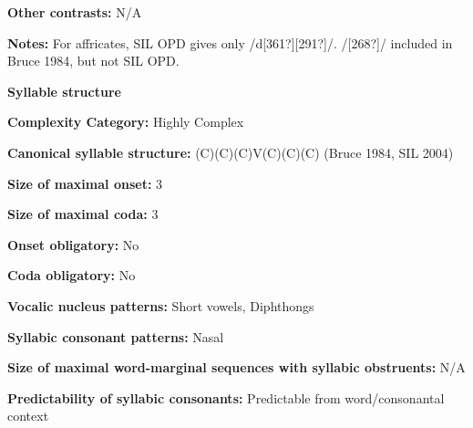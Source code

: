 \begin{styleBody}
\textbf{Other contrasts:} N/A
\end{styleBody}

\begin{styleBody}
\textbf{Notes:} For affricates, SIL OPD gives only /d[361?][291?]/. /[268?]/ included in Bruce 1984, but not SIL OPD.
\end{styleBody}

\begin{styleBody}
\textbf{Syllable structure}
\end{styleBody}

\begin{styleBody}
\textbf{Complexity Category:} Highly Complex
\end{styleBody}

\begin{styleBody}
\textbf{Canonical syllable structure:} (C)(C)(C)V(C)(C)(C)\textbf{ }(Bruce 1984, SIL 2004)
\end{styleBody}

\begin{styleBody}
\textbf{Size of maximal onset:} 3
\end{styleBody}

\begin{styleBody}
\textbf{Size of maximal coda:} 3
\end{styleBody}

\begin{styleBody}
\textbf{Onset obligatory:} No
\end{styleBody}

\begin{styleBody}
\textbf{Coda obligatory:} No
\end{styleBody}

\begin{styleBody}
\textbf{Vocalic nucleus patterns:} Short vowels, Diphthongs
\end{styleBody}

\begin{styleBody}
\textbf{Syllabic consonant patterns:} Nasal
\end{styleBody}

\begin{styleBody}
\textbf{Size of maximal word{}-marginal sequences with syllabic obstruents:} N/A
\end{styleBody}

\begin{styleBody}
\textbf{Predictability of syllabic consonants:} Predictable from word/consonantal context
\end{styleBody}

